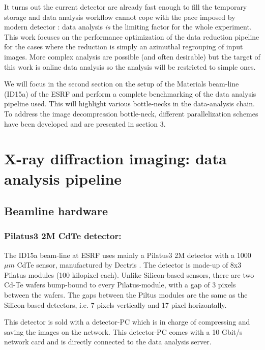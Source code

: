 \documentclass[preprint]{iucr}              %
\begin{document}
 
It turns out the current detector are already fast enough to fill the temporary
storage and data analysis workflow cannot cope with the pace imposed by
modern detector \cite{GigaFRoST}: data analysis \emph{is} the limiting factor
for the whole experiment.
This work focuses on the performance optimization of the data reduction
pipeline for the cases where the reduction is simply an azimuthal
regrouping of input images.
More complex analysis are possible (and often desirable) but the target of this
work is online data analysis so the analysis will be restricted to simple ones.

We will focus in the second section on the setup of the Materials beam-line
(ID15a) of the ESRF  \cite{id15a} and perform a complete benchmarking of the
data analysis pipeline used. 
This will highlight various bottle-necks in the data-analysis chain.
To address the image decompression bottle-neck, different parallelization
schemes have been developed and are presented in section 3. 

\section{X-ray diffraction imaging: data analysis pipeline}

\subsection{Beamline hardware}

\subsubsection{Pilatus3 2M CdTe detector:}

The ID15a beam-line at ESRF uses mainly a Pilatus3 2M detector with a 1000 $\mu
m$ CdTe sensor, manufactured by Dectris \cite{pilatus}. 
The detector is made-up of 8x3 Pilatus modules (100 kilopixel each).
Unlike Silicon-based sensors, there are two Cd-Te wafers bump-bound to every
Pilatus-module, with a gap of 3 pixels between the wafers.
The gaps between the Piltus modules are the same as the Silicon-based
detectors, i.e. 7 pixels vertically and 17 pixel horizontally.

This detector is sold with a detector-PC which is in charge of compressing and
saving the images on the network. 
This detector-PC comes with a 10 Gbit/s network card and is directly connected
to the data analysis server.
\end{document}
